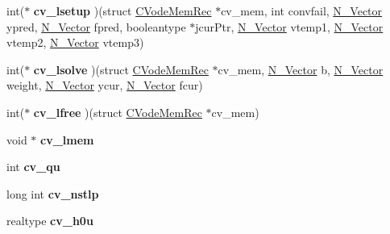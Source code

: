 \begin{DoxyCompactItemize}
\item 
\mbox{\label{structCVodeMemRec_ab8a54a7e663e37fd89e02a4ae1df6610}} 
int($\ast$ {\bfseries cv\+\_\+lsetup} )(struct \mbox{\hyperlink{structCVodeMemRec}{C\+Vode\+Mem\+Rec}} $\ast$cv\+\_\+mem, int convfail, \mbox{\hyperlink{struct__generic__N__Vector}{N\+\_\+\+Vector}} ypred, \mbox{\hyperlink{struct__generic__N__Vector}{N\+\_\+\+Vector}} fpred, booleantype $\ast$jcur\+Ptr, \mbox{\hyperlink{struct__generic__N__Vector}{N\+\_\+\+Vector}} vtemp1, \mbox{\hyperlink{struct__generic__N__Vector}{N\+\_\+\+Vector}} vtemp2, \mbox{\hyperlink{struct__generic__N__Vector}{N\+\_\+\+Vector}} vtemp3)
\item 
\mbox{\label{structCVodeMemRec_a8e7b03709944510d8a60bf5b2549c2b6}} 
int($\ast$ {\bfseries cv\+\_\+lsolve} )(struct \mbox{\hyperlink{structCVodeMemRec}{C\+Vode\+Mem\+Rec}} $\ast$cv\+\_\+mem, \mbox{\hyperlink{struct__generic__N__Vector}{N\+\_\+\+Vector}} b, \mbox{\hyperlink{struct__generic__N__Vector}{N\+\_\+\+Vector}} weight, \mbox{\hyperlink{struct__generic__N__Vector}{N\+\_\+\+Vector}} ycur, \mbox{\hyperlink{struct__generic__N__Vector}{N\+\_\+\+Vector}} fcur)
\item 
\mbox{\label{structCVodeMemRec_af2f89bb0c229986330c55645cd91761d}} 
int($\ast$ {\bfseries cv\+\_\+lfree} )(struct \mbox{\hyperlink{structCVodeMemRec}{C\+Vode\+Mem\+Rec}} $\ast$cv\+\_\+mem)
\item 
\mbox{\label{structCVodeMemRec_ad1459feb9793b2870ad7e015f3df4f12}} 
void $\ast$ {\bfseries cv\+\_\+lmem}
\item 
\mbox{\label{structCVodeMemRec_aaf2ceb46e8245cff229326b891b4188b}} 
int {\bfseries cv\+\_\+qu}
\item 
\mbox{\label{structCVodeMemRec_ac9a2fbebcc5ea0d3740e78daf2defee4}} 
long int {\bfseries cv\+\_\+nstlp}
\item 
\mbox{\label{structCVodeMemRec_a5f7fcabc972bc7229ddbaff4d93475e2}} 
realtype {\bfseries cv\+\_\+h0u}
\item 
\mbox{\label{structCVodeMemRec_a6813bf2e099702d2b4fbb19f37ece971}} 

\end{DoxyCompactItemize}
